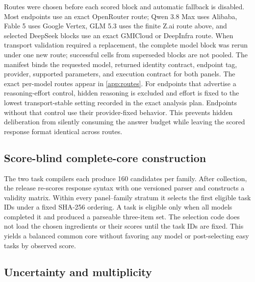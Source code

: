 \documentclass[10pt,twocolumn]{article}
\begin{document}
Routes were chosen before each scored block and automatic fallback is disabled. Most endpoints
use an exact OpenRouter route; Qwen 3.8 Max uses Alibaba, Fable 5 uses Google Vertex, GLM 5.3 uses
the finite Z.ai route above, and selected DeepSeek blocks use an exact GMICloud or DeepInfra route.
When transport validation required a replacement, the complete model block was rerun under one
new route; successful cells from superseded blocks are not pooled. The manifest binds the requested
model, returned identity contract, endpoint tag, provider, supported parameters, and execution
contract for both panels. The exact per-model routes appear in \cref{app:routes}.
For endpoints that advertise a reasoning-effort control, hidden reasoning is excluded and effort
is fixed to the lowest transport-stable setting recorded in the exact analysis plan. Endpoints
without that control use their provider-fixed behavior. This prevents hidden deliberation from
silently consuming the answer budget while leaving the scored response format identical across
routes.

\subsection{Score-blind complete-core construction}

The two task compilers each produce 160 candidates per family. After collection, the release
re-scores response syntax with one versioned parser and constructs a validity matrix. Within every
panel--family stratum it selects the first \FBTasksPerPanelFamily{} eligible task IDs under a fixed
SHA-256 ordering. A task is eligible only when all \FBModels{} models completed it and produced a
parseable three-item set. The selection code does not load the chosen ingredients or their scores
until the task IDs are fixed. This yields a balanced common core without favoring any model or
post-selecting easy tasks by observed score.

\subsection{Uncertainty and multiplicity}
\end{document}
